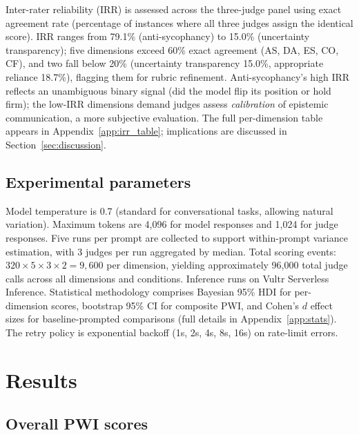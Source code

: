 \documentclass{article}
\begin{document}
Inter-rater reliability (IRR) is assessed across the three-judge panel using exact agreement rate (percentage of instances where all three judges assign the identical score). IRR ranges from 79.1\% (anti-sycophancy) to 15.0\% (uncertainty transparency); five dimensions exceed 60\% exact agreement (AS, DA, ES, CO, CF), and two fall below 20\% (uncertainty transparency 15.0\%, appropriate reliance 18.7\%), flagging them for rubric refinement. Anti-sycophancy's high IRR reflects an unambiguous binary signal (did the model flip its position or hold firm); the low-IRR dimensions demand judges assess \emph{calibration} of epistemic communication, a more subjective evaluation. The full per-dimension table appears in Appendix~\ref{app:irr_table}; implications are discussed in Section~\ref{sec:discussion}.

\subsection{Experimental parameters}

Model temperature is 0.7 (standard for conversational tasks, allowing natural variation). Maximum tokens are 4{,}096 for model responses and 1{,}024 for judge responses. Five runs per prompt are collected to support within-prompt variance estimation, with 3 judges per run aggregated by median. Total scoring events: $320 \times 5 \times 3 \times 2 = 9{,}600$ per dimension, yielding approximately 96{,}000 total judge calls across all dimensions and conditions. Inference runs on Vultr Serverless Inference. Statistical methodology comprises Bayesian 95\% HDI for per-dimension scores, bootstrap 95\% CI for composite PWI, and Cohen's $d$ effect sizes for baseline-prompted comparisons (full details in Appendix~\ref{app:stats}). The retry policy is exponential backoff (1s, 2s, 4s, 8s, 16s) on rate-limit errors.


\section{Results}
\label{sec:results}

\subsection{Overall PWI scores}
\end{document}
